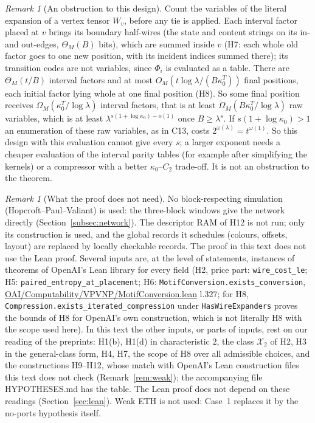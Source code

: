 \documentclass[11pt]{article}
\theoremstyle{definition}
\theoremstyle{remark}
\newtheorem{remark}[theorem]{Remark}
\newcommand{\X}{\mathcal X}
\newcommand{\src}[1]{\url{#1}}
\begin{document}
\begin{remark}[An obstruction to this design]
Count the variables of the literal expansion of a vertex tensor $W_v$, before any tie is applied. Each interval factor
placed at $v$ brings its boundary half-wires (the state and content strings on its in- and out-edges, $\Theta_M(B)$ bits), which are
summed inside $v$ (H7: each whole old factor goes to one new position, with its incident indices summed there); its transition codes
are not variables, since $\Phi_i$ is evaluated as a table. There are $\Theta_M(t/B)$ interval factors and at most
$O_M(t\log\lambda/(B\kappa_0^T))$ final positions, each initial factor lying whole at one final position (H8). So some final position
receives $\Omega_M(\kappa_0^T/\log\lambda)$ interval factors, that is at least $\Omega_M(B\kappa_0^T/\log\lambda)$ raw variables,
which is at least $\lambda^{s(1+\log\kappa_0)-o(1)}$ once $B\ge\lambda^{s}$. If $s(1+\log\kappa_0)>1$ an enumeration of these raw
variables, as in C13, costs $2^{\omega(\lambda)}=t^{\omega(1)}$. So this design with this evaluation cannot give every $s$; a larger
exponent needs a cheaper evaluation of the interval parity tables (for example after simplifying the kernels) or a compressor with a
better $\kappa_0$--$C_2$ trade-off. It is not an obstruction to the theorem.
\end{remark}

\begin{remark}[What the proof does not need]
No block-respecting simulation (Hopcroft--Paul--Valiant) is used: the three-block windows give the network directly
(Section~\ref{subsec:network}). The descriptor RAM of H12 is not run; only its construction is used, and the global records it
schedules (colours, offsets, layout) are replaced by locally checkable records. The proof in this text does not use the Lean proof.
Several inputs are, at the level of statements, instances of theorems of OpenAI's Lean library for every field (H2, price
part: \texttt{wire\_cost\_le}; H5: \texttt{paired\_entropy\_at\_placement}; H6: \texttt{MotifConversion.exists\_conversion},
\src{OAI/Computability/VPVNP/MotifConversion.lean} l.327; for H8, \texttt{Compression.exists\_iterated\_compression} under
\texttt{HasWireExpanders} proves the bounds of H8 for OpenAI's own construction, which is not literally H8 with the scope used
here). In this text the other inputs, or parts of inputs, rest on our reading of the preprints: H1(b), H1(d) in characteristic $2$, the class
$\X_2$ of H2, H3 in the general-class form, H4, H7, the scope of H8 over all admissible choices, and the constructions H9--H12, whose match with
OpenAI's Lean construction files this text does not check (Remark~\ref{rem:weak}); the accompanying file HYPOTHESES.md has the table. The Lean proof does not depend on these readings (Section~\ref{sec:lean}). Weak ETH is not used: Case~1 replaces it by the no-ports hypothesis itself.
\end{remark}
\end{document}
